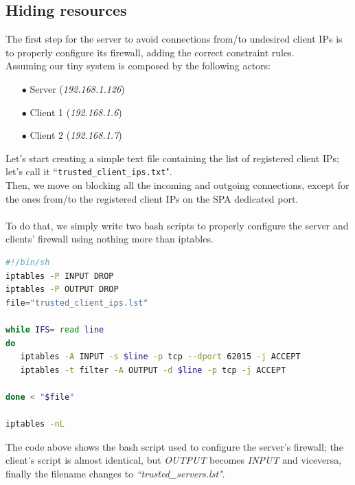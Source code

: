 \documentclass[12pt]{report}
\begin{document}
{{\subsection{Hiding resources}
\bigskip
The first step for the server to avoid connections from/to undesired client IPs is to properly configure its firewall, adding the correct constraint rules.\\
Assuming our tiny system is composed by the following actors:
\bigskip
\begin{itemize}
\setlength{\itemindent}{+4mm}
\item[$\bullet$] Server (\emph{192.168.1.126})
\item[$\bullet$] Client 1 (\emph{192.168.1.6})
\item[$\bullet$] Client 2 (\emph{192.168.1.7})\\
\end{itemize}

Let's start creating a simple text file containing the list of registered client IPs; let's call it ``\texttt{trusted\_client\_ips.txt}".\\
Then, we move on blocking all the incoming and outgoing connections, except for the ones from/to the registered client IPs on the SPA dedicated port.\\\\
To do that, we simply write two bash scripts to properly configure the server and clients' firewall using nothing more than iptables.

\clearpage
\begin{center}
  \lstset{%
    caption=Server's firewall configuration script,
    basicstyle=\ttfamily\small\bfseries,
    frame=tb
  }
  
\begin{lstlisting}[language=bash]
#!/bin/sh
iptables -P INPUT DROP
iptables -P OUTPUT DROP
file="trusted_client_ips.lst"

while IFS= read line
do
   iptables -A INPUT -s $line -p tcp --dport 62015 -j ACCEPT
   iptables -t filter -A OUTPUT -d $line -p tcp -j ACCEPT

done < "$file"

iptables -nL
\end{lstlisting}
\end{center}

The code above shows the bash script used to configure the server's firewall; the client's script is almost identical, but \emph{OUTPUT} becomes \emph{INPUT} and viceversa, finally the filename changes to \emph{``trusted\_servers.lst"}.\\


}}
\end{document}

